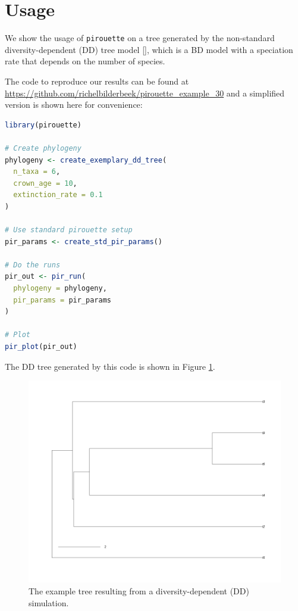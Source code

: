\section{Usage}

We show the usage of \verb;pirouette; on a tree generated 
by the non-standard diversity-dependent (DD) tree 
model [\citep{DDD, etienne2012diversity}],
which is a BD model with a speciation rate that depends on the number of species. 

The code to reproduce our results can be found at  
\url{https://github.com/richelbilderbeek/pirouette_example_30}
and a simplified version is shown here for convenience:

\begin{lstlisting}[language=R]
library(pirouette)

# Create phylogeny
phylogeny <- create_exemplary_dd_tree(
  n_taxa = 6, 
  crown_age = 10,
  extinction_rate = 0.1
)

# Use standard pirouette setup
pir_params <- create_std_pir_params()

# Do the runs
pir_out <- pir_run(
  phylogeny = phylogeny,
  pir_params = pir_params
)

# Plot
pir_plot(pir_out)
\end{lstlisting}

The DD tree generated by this code is shown in Figure \ref{fig:dd_tree}. 

\begin{figure}[H]
  \includegraphics[width=\textwidth]{pirouette_example_30/example_30_314/true_tree.png}
  \caption{
    The example tree resulting from a diversity-dependent (DD) simulation.
  }
  \label{fig:dd_tree}
\end{figure}


